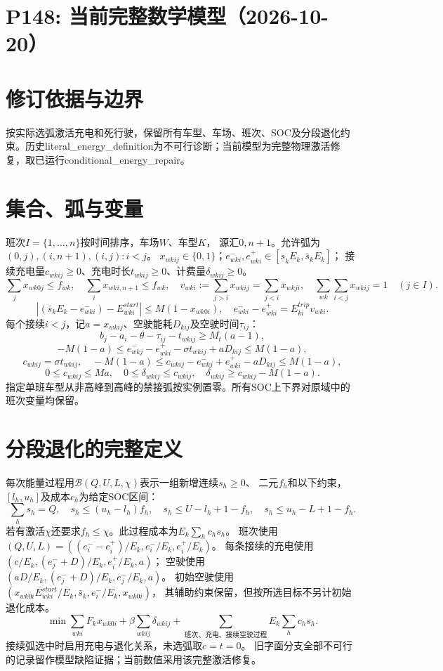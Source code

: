 \documentclass[11pt]{ctexart}
\begin{document}
\section*{P148: 当前完整数学模型（2026-10-20）}
\section*{修订依据与边界}按实际选弧激活充电和死行驶，保留所有车型、车场、班次、SOC及分段退化约束。历史literal_energy_definition为不可行诊断；当前模型为完整物理激活修复，取已运行conditional_energy_repair。

\section*{集合、弧与变量}
班次$I=\{1,\ldots,n\}$按时间排序，车场$W$、车型$K$，
源汇$0,n+1$。允许弧为$(0,j),(i,n+1),(i,j):i<j$。
$x_{wkij}\in\{0,1\}$；$e^-_{wki},e^+_{wki}\in[\underline s_kE_k,\bar s_kE_k]$；
接续充电量$c_{wkij}\ge0$、充电时长$t_{wkij}\ge0$、计费量$\delta_{wkij}\ge0$。
\[
\sum_jx_{wk0j}\le f_{wk},\quad\sum_ix_{wki,n+1}\le f_{wk},\quad
v_{wki}:=\sum_{j>i}x_{wkij}=\sum_{j<i}x_{wkji},\quad
\sum_{wk}\sum_{i<j}x_{wkij}=1\quad(j\in I).
\]
\[
|(\bar s_kE_k-e^-_{wki})-E^{start}_{wki}|\le M(1-x_{wk0i}),\quad
e^-_{wki}-e^+_{wki}=E^{trip}_{ki}v_{wki}.
\]
每个接续$i<j$，记$a=x_{wkij}$、空驶能耗$D_{kij}$及空驶时间$\tau_{ij}$：
\[
b_j-a_i-\theta-\tau_{ij}-t_{wkij}\ge M_t(a-1),
\]
\[
-M(1-a)\le e^-_{wkj}-e^+_{wki}-\sigma t_{wkij}+aD_{kij}\le M(1-a),
\]
\[
c_{wkij}=\sigma t_{wkij},\quad
-M(1-a)\le c_{wkij}-e^-_{wkj}+e^+_{wki}-aD_{kij}\le M(1-a),
\]
\[
0\le c_{wkij}\le Ma,\quad
0\le\delta_{wkij}\le c_{wkij},\quad
\delta_{wkij}\ge c_{wkij}-M(1-a).
\]
指定单班车型从非高峰到高峰的禁接弧按实例置零。所有SOC上下界对原域中的班次变量均保留。
\section*{分段退化的完整定义}
每次能量过程用$\mathcal B(Q,U,L,\chi)$表示一组新增连续$s_h\ge0$、
二元$f_h$和以下约束，$[l_h,u_h]$及成本$c_h$为给定SOC区间：
\[
\sum_hs_h=Q,\quad s_h\le(u_h-l_h)f_h,\quad
s_h\le U-l_h+1-f_h,\quad s_h\le u_h-L+1-f_h.
\]
若有激活$\chi$还要求$f_h\le\chi$。此过程成本为$E_k\sum_hc_hs_h$。
班次使用$(Q,U,L)=((e^-_i-e^+_i)/E_k,e^-_i/E_k,e^+_i/E_k)$。
每条接续的充电使用$(c/E_k,(e^-_j+D)/E_k,e^+_i/E_k,a)$；
空驶使用$(aD/E_k,(e^-_j+D)/E_k,e^-_j/E_k,a)$。
初始空驶使用$(x_{wk0i}E^{start}_{wki}/E_k,\bar s_k,e^-_i/E_k,x_{wk0i})$，
其辅助约束保留，但按所选目标不另计初始退化成本。
\[
\min\sum_{wki}F_kx_{wk0i}+\beta\sum_{wkij}\delta_{wkij}
+\sum_{\text{班次、充电、接续空驶过程}}E_k\sum_hc_hs_h.
\]
接续弧选中时启用充电与退化关系，未选弧取$c=t=0$。
旧字面分支全部不可行的记录留作模型缺陷证据；当前数值采用该完整激活修复。
\end{document}

